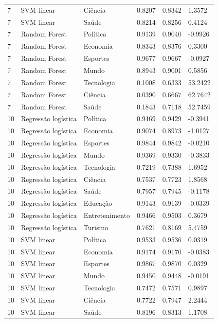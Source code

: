 \begin{tabular}{llllll}
7 & SVM linear & Ciência & 0.8207 & 0.8342 & 1.3572 \\
7 & SVM linear & Saúde & 0.8214 & 0.8256 & 0.4124 \\
7 & Random Forest & Política & 0.9139 & 0.9040 & -0.9926 \\
7 & Random Forest & Economia & 0.8343 & 0.8376 & 0.3300 \\
7 & Random Forest & Esportes & 0.9677 & 0.9667 & -0.0927 \\
7 & Random Forest & Mundo & 0.8943 & 0.9001 & 0.5856 \\
7 & Random Forest & Tecnologia & 0.1008 & 0.6333 & 53.2422 \\
7 & Random Forest & Ciência & 0.0390 & 0.6667 & 62.7642 \\
7 & Random Forest & Saúde & 0.1843 & 0.7118 & 52.7459 \\
10 & Regressão logística & Política & 0.9469 & 0.9429 & -0.3941 \\
10 & Regressão logística & Economia & 0.9074 & 0.8973 & -1.0127 \\
10 & Regressão logística & Esportes & 0.9844 & 0.9842 & -0.0210 \\
10 & Regressão logística & Mundo & 0.9369 & 0.9330 & -0.3833 \\
10 & Regressão logística & Tecnologia & 0.7219 & 0.7388 & 1.6952 \\
10 & Regressão logística & Ciência & 0.7537 & 0.7723 & 1.8568 \\
10 & Regressão logística & Saúde & 0.7957 & 0.7945 & -0.1178 \\
10 & Regressão logística & Educação & 0.9143 & 0.9139 & -0.0339 \\
10 & Regressão logística & Entretenimento & 0.9466 & 0.9503 & 0.3679 \\
10 & Regressão logística & Turismo & 0.7621 & 0.8169 & 5.4759 \\
10 & SVM linear & Política & 0.9533 & 0.9536 & 0.0319 \\
10 & SVM linear & Economia & 0.9174 & 0.9170 & -0.0383 \\
10 & SVM linear & Esportes & 0.9867 & 0.9870 & 0.0329 \\
10 & SVM linear & Mundo & 0.9450 & 0.9448 & -0.0191 \\
10 & SVM linear & Tecnologia & 0.7472 & 0.7571 & 0.9897 \\
10 & SVM linear & Ciência & 0.7722 & 0.7947 & 2.2444 \\
10 & SVM linear & Saúde & 0.8196 & 0.8313 & 1.1708 \\

\end{tabular}
